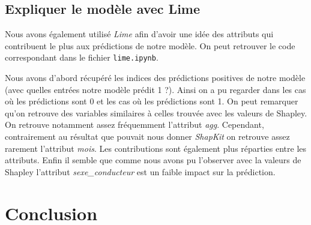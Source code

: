 \documentclass{article}
\begin{document}
    \subsection{Expliquer le modèle avec Lime}
    Nous avons également utilisé \textit{Lime} afin d'avoir une idée des attributs qui contribuent
    le plus aux prédictions de notre modèle. On peut retrouver le code correspondant dans le fichier 
    \texttt{lime.ipynb}.

    Nous avons d'abord récupéré les indices des prédictions positives de notre modèle (avec quelles 
    entrées notre modèle prédit 1 ?). Ainsi on a pu regarder dans les cas où les prédictions sont 0 
    et les cas où les prédictions sont 1.
    On peut remarquer qu'on retrouve des variables similaires à celles trouvée avec les valeurs de 
    Shapley. On retrouve notamment assez fréquemment l'attribut \textit{agg}.
    Cependant, contrairement au résultat que pouvait nous donner \textit{ShapKit} on retrouve assez 
    rarement l'attribut \textit{mois}. Les contributions sont également plus réparties entre les attributs.
    Enfin il semble que comme nous avons pu l'observer avec la valeurs de Shapley l'attribut 
    \textit{sexe\_conducteur} est un faible impact sur la prédiction.

    \section{Conclusion}


    \newpage
    \appendix
\end{document}
